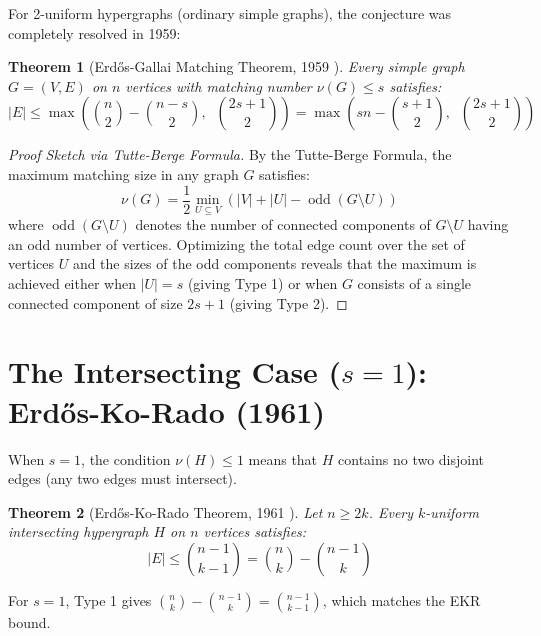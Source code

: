 \documentclass[11pt,a4paper]{article}
\newtheorem{theorem}{Theorem}[section]
\theoremstyle{definition}
\begin{document}
For 2-uniform hypergraphs (ordinary simple graphs), the conjecture was completely resolved in 1959:

\begin{theorem}[Erd\H{o}s-Gallai Matching Theorem, 1959 \cite{erdos1959gallai}]\label{thm:erdos_gallai_matching}
Every simple graph $G = (V, E)$ on $n$ vertices with matching number $\nu(G) \le s$ satisfies:
\begin{equation}\label{eq:eg_matching}
|E| \le \max\left( \binom{n}{2} - \binom{n - s}{2}, \;\; \binom{2s + 1}{2} \right) = \max\left( s n - \binom{s + 1}{2}, \;\; \binom{2s + 1}{2} \right)
\end{equation}
\end{theorem}

\begin{proof}[Proof Sketch via Tutte-Berge Formula]
By the Tutte-Berge Formula, the maximum matching size in any graph $G$ satisfies:
\[ \nu(G) = \frac{1}{2} \min_{U \subseteq V} \left( |V| + |U| - \operatorname{odd}(G \setminus U) \right) \]
where $\operatorname{odd}(G \setminus U)$ denotes the number of connected components of $G \setminus U$ having an odd number of vertices.
Optimizing the total edge count over the set of vertices $U$ and the sizes of the odd components reveals that the maximum is achieved either when $|U| = s$ (giving Type 1) or when $G$ consists of a single connected component of size $2s + 1$ (giving Type 2).
\end{proof}

\section{The Intersecting Case ($s = 1$): Erd\H{o}s-Ko-Rado (1961)}

When $s = 1$, the condition $\nu(H) \le 1$ means that $H$ contains no two disjoint edges (any two edges must intersect).

\begin{theorem}[Erd\H{o}s-Ko-Rado Theorem, 1961 \cite{ekr1961}]\label{thm:ekr}
Let $n \ge 2k$. Every $k$-uniform intersecting hypergraph $H$ on $n$ vertices satisfies:
\begin{equation}\label{eq:ekr}
|E| \le \binom{n - 1}{k - 1} = \binom{n}{k} - \binom{n - 1}{k}
\end{equation}
\end{theorem}

For $s = 1$, Type 1 gives $\binom{n}{k} - \binom{n - 1}{k} = \binom{n - 1}{k - 1}$, which matches the EKR bound.
\end{document}
